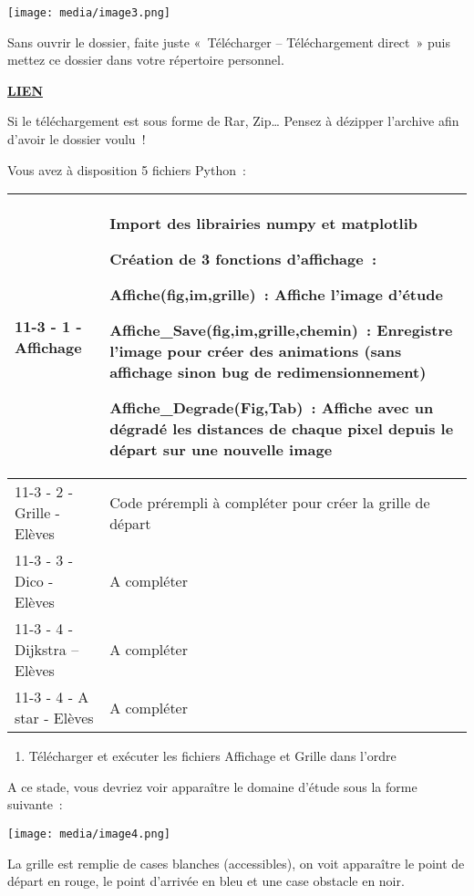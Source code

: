 \documentclass[
]{article}
\begin{document}
\texttt{[image: media/image3.png]}

Sans ouvrir le dossier, faite juste «~Télécharger -- Téléchargement
direct~» puis mettez ce dossier dans votre répertoire personnel.

\href{https://www.dropbox.com/sh/pe158jwai7yqkol/AAA3N3sptIYvkH64A90r2DUqa?dl=0}{\textbf{LIEN}}

Si le téléchargement est sous forme de Rar, Zip\ldots{} Pensez à
dézipper l'archive afin d'avoir le dossier voulu~!

Vous avez à disposition 5 fichiers Python~:

\begin{longtable}[]{@{}ll@{}}
\toprule
\begin{minipage}[b]{0.47\columnwidth}\raggedright
11-3 - 1 - Affichage\strut
\end{minipage} & \begin{minipage}[b]{0.47\columnwidth}\raggedright
Import des librairies numpy et matplotlib

Création de 3 fonctions d'affichage~:

Affiche(fig,im,grille)~: Affiche l'image d'étude

Affiche\_Save(fig,im,grille,chemin)~: Enregistre l'image pour créer des
animations (sans affichage sinon bug de redimensionnement)

Affiche\_Degrade(Fig,Tab)~: Affiche avec un dégradé les distances de
chaque pixel depuis le départ sur une nouvelle image\strut
\end{minipage}\tabularnewline
\midrule
\endhead
11-3 - 2 - Grille - Elèves & Code prérempli à compléter pour créer la
grille de départ\tabularnewline
11-3 - 3 - Dico - Elèves & A compléter\tabularnewline
11-3 - 4 - Dijkstra -- Elèves & A compléter\tabularnewline
11-3 - 4 - A star - Elèves & A compléter\tabularnewline
\bottomrule
\end{longtable}

\begin{enumerate}
\def\labelenumi{\arabic{enumi}.}
\item
  Télécharger et exécuter les fichiers Affichage et Grille dans l'ordre
\end{enumerate}

A ce stade, vous devriez voir apparaître le domaine d'étude sous la
forme suivante~:

\texttt{[image: media/image4.png]}

La grille est remplie de cases blanches (accessibles), on voit
apparaître le point de départ en rouge, le point d'arrivée en bleu et
une case obstacle en noir.
\end{document}
